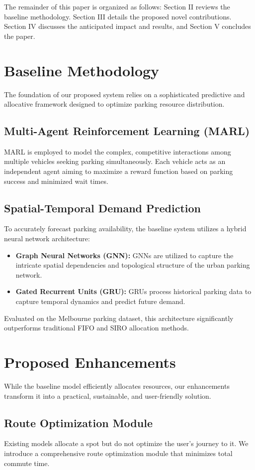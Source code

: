\documentclass[conference]{IEEEtran}
\begin{document}
The remainder of this paper is organized as follows: Section II reviews the baseline methodology. Section III details the proposed novel contributions. Section IV discusses the anticipated impact and results, and Section V concludes the paper.

\section{Baseline Methodology}
The foundation of our proposed system relies on a sophisticated predictive and allocative framework designed to optimize parking resource distribution.

\subsection{Multi-Agent Reinforcement Learning (MARL)}
MARL is employed to model the complex, competitive interactions among multiple vehicles seeking parking simultaneously. Each vehicle acts as an independent agent aiming to maximize a reward function based on parking success and minimized wait times.

\subsection{Spatial-Temporal Demand Prediction}
To accurately forecast parking availability, the baseline system utilizes a hybrid neural network architecture:
\begin{itemize}
    \item \textbf{Graph Neural Networks (GNN):} GNNs are utilized to capture the intricate spatial dependencies and topological structure of the urban parking network.
    \item \textbf{Gated Recurrent Units (GRU):} GRUs process historical parking data to capture temporal dynamics and predict future demand.
\end{itemize}
Evaluated on the Melbourne parking dataset, this architecture significantly outperforms traditional FIFO and SIRO allocation methods.

\section{Proposed Enhancements}
While the baseline model efficiently allocates resources, our enhancements transform it into a practical, sustainable, and user-friendly solution.

\subsection{Route Optimization Module}
Existing models allocate a spot but do not optimize the user's journey to it. We introduce a comprehensive route optimization module that minimizes total commute time.
\end{document}
